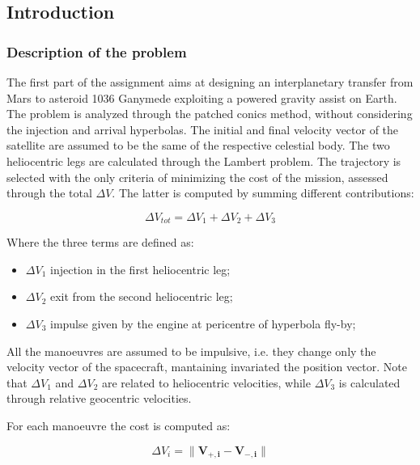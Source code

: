 \subsection{Introduction}
\label{subsec:introduction}

\subsubsection{Description of the problem}
\label{subsubsec:description}
The first part of the assignment aims at designing an interplanetary transfer from Mars to asteroid 1036 Ganymede exploiting a powered gravity assist on Earth. The problem is analyzed through the patched conics method, without considering the injection and arrival hyperbolas. The initial and final velocity vector of the satellite are assumed to be the same of the respective celestial body. The two heliocentric legs are calculated through the Lambert problem. The trajectory is selected with the only criteria of minimizing the cost of the mission, assessed through the total $\Delta V$. The latter is computed by summing different contributions:

\begin{equation}
    \Delta V_{tot}= \Delta V_1 + \Delta V_2 + \Delta V_3
\end{equation}

Where the three terms are defined as:
\begin{itemize}
    [wide,itemsep=3pt,topsep=3pt]
    \item $\Delta V_1$ injection in the first heliocentric leg;
    \item $\Delta V_2$ exit from the second heliocentric leg;
    \item $\Delta V_3$ impulse given by the engine at pericentre of hyperbola fly-by;
\end{itemize}


All the manoeuvres are assumed to be impulsive, i.e. they change only the velocity vector of the spacecraft, mantaining invariated the position vector. Note that $\Delta V_{1}$ and $\Delta V_{2}$ are related to heliocentric velocities, while $\Delta V_{3}$ is calculated through relative geocentric velocities. 

For each manoeuvre the cost is computed as:

\begin{equation}
    \Delta V_i= \lVert \boldsymbol{V_{+,i}} - \boldsymbol{V_{-,i}} \rVert
\end{equation}



